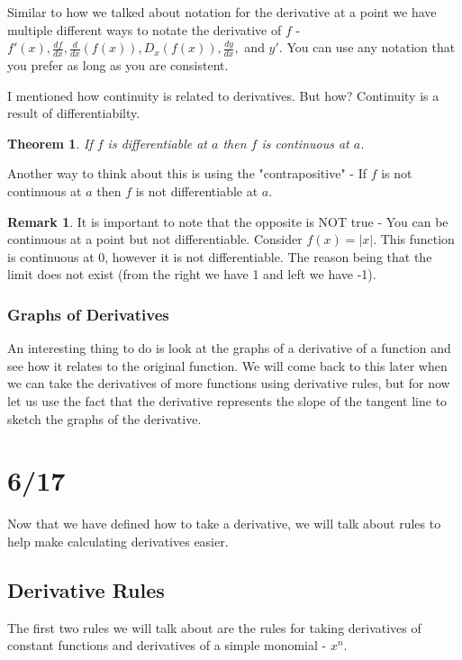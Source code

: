 \documentclass[12pt,reqno]{article}
\newtheorem{Theorem}{Theorem}
\theoremstyle{definition}
\newtheorem*{Remark}{Remark}
\begin{document}
Similar to how we talked about notation for the derivative at a point we have multiple different ways to notate the derivative of $f$ - $f'(x), \frac{df}{dx}, \frac{d}{dx}(f(x)), D_x (f(x)), \frac{dy}{dx}, $ and $y'$. You can use any notation that you prefer as long as you are consistent. 

I mentioned how continuity is related to derivatives. But how? Continuity is a result of differentiabilty. 
\begin{Theorem}
	If $f$ is differentiable at $a$ then $f$ is continuous at $a$. 
\end{Theorem} 

Another way to think about this is using the "contrapositive" - If $f$ is not continuous at $a$ then $f$ is not differentiable at $a$.

\begin{Remark}
	It is important to note that the opposite is NOT true - You can be continuous at a point but not differentiable. Consider $f(x) = |x|$. This function is continuous at $0$, however it is not differentiable. The reason being that the limit does not exist (from the right we have 1 and left we have -1). 
\end{Remark} 



\subsubsection{Graphs of Derivatives}
An interesting thing to do is look at the graphs of a derivative of a function and see how it relates to the original function. We will come back to this later when we can take the derivatives of more functions using derivative rules, but for now let us use the fact that the derivative represents the slope of the tangent line to sketch the graphs of the derivative. 


\section{6/17}
Now that we have defined how to take a derivative, we will talk about rules to help make calculating derivatives easier. 
\subsection{Derivative Rules} 

The first two rules we will talk about are the rules for taking derivatives of constant functions and derivatives of a simple monomial - $x^n$. 
\end{document}
